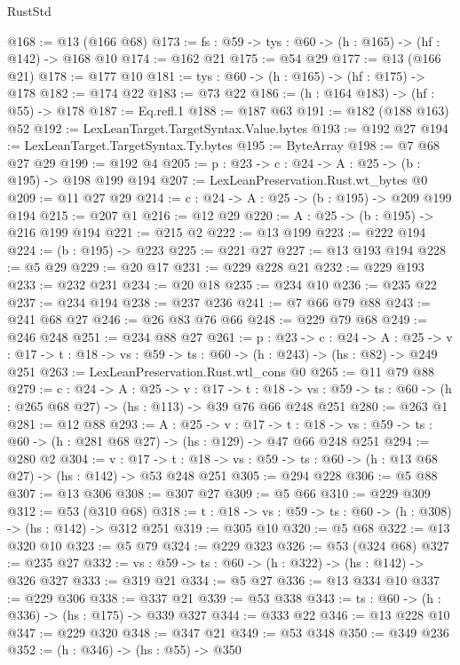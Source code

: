 \begin{lexlean}{RustStd}
\begin{coremodule}
@168 := @13 (@166 @68)
@173 := {fs : @59} -> {tys : @60} -> (h : @165) -> (hf : @142) -> @168 @10
@174 := @162 @21
@175 := @54 @29
@177 := @13 (@166 @21)
@178 := @177 @10
@181 := {tys : @60} -> (h : @165) -> (hf : @175) -> @178
@182 := @174 @22
@183 := @73 @22
@186 := (h : @164 @183) -> (hf : @55) -> @178
@187 := Eq.refl.{1}
@188 := @187 @63
@191 := @182 (@188 @163) @52
@192 := LexLeanTarget.TargetSyntax.Value.bytes
@193 := @192 @27
@194 := LexLeanTarget.TargetSyntax.Ty.bytes
@195 := ByteArray
@198 := @7 @68 @27 @29
@199 := @192 @4
@205 := {p : @23} -> {c : @24} -> {A : @25} -> (b : @195) -> @198 @199 @194
@207 := LexLeanPreservation.Rust.wt_bytes @0
@209 := @11 @27 @29
@214 := {c : @24} -> {A : @25} -> (b : @195) -> @209 @199 @194
@215 := @207 @1
@216 := @12 @29
@220 := {A : @25} -> (b : @195) -> @216 @199 @194
@221 := @215 @2
@222 := @13 @199
@223 := @222 @194
@224 := (b : @195) -> @223
@225 := @221 @27
@227 := @13 @193 @194
@228 := @5 @29
@229 := @20 @17
@231 := @229 @228 @21
@232 := @229 @193
@233 := @232 @231
@234 := @20 @18
@235 := @234 @10
@236 := @235 @22
@237 := @234 @194
@238 := @237 @236
@241 := @7 @66 @79 @88
@243 := @241 @68 @27
@246 := @26 @83 @76 @66
@248 := @229 @79 @68
@249 := @246 @248
@251 := @234 @88 @27
@261 := {p : @23} ->
  {c : @24} ->
  {A : @25} ->
  {v : @17} -> {t : @18} -> {vs : @59} -> {ts : @60} -> (h : @243) -> (hs : @82) -> @249 @251
@263 := LexLeanPreservation.Rust.wtl_cons @0
@265 := @11 @79 @88
@279 := {c : @24} ->
  {A : @25} ->
  {v : @17} ->
  {t : @18} ->
  {vs : @59} -> {ts : @60} -> (h : @265 @68 @27) -> (hs : @113) -> @39 @76 @66 @248 @251
@280 := @263 @1
@281 := @12 @88
@293 := {A : @25} ->
  {v : @17} ->
  {t : @18} -> {vs : @59} -> {ts : @60} -> (h : @281 @68 @27) -> (hs : @129) -> @47 @66 @248 @251
@294 := @280 @2
@304 := {v : @17} ->
  {t : @18} -> {vs : @59} -> {ts : @60} -> (h : @13 @68 @27) -> (hs : @142) -> @53 @248 @251
@305 := @294 @228
@306 := @5 @88
@307 := @13 @306
@308 := @307 @27
@309 := @5 @66
@310 := @229 @309
@312 := @53 (@310 @68)
@318 := {t : @18} -> {vs : @59} -> {ts : @60} -> (h : @308) -> (hs : @142) -> @312 @251
@319 := @305 @10
@320 := @5 @68
@322 := @13 @320 @10
@323 := @5 @79
@324 := @229 @323
@326 := @53 (@324 @68)
@327 := @235 @27
@332 := {vs : @59} -> {ts : @60} -> (h : @322) -> (hs : @142) -> @326 @327
@333 := @319 @21
@334 := @5 @27
@336 := @13 @334 @10
@337 := @229 @306
@338 := @337 @21
@339 := @53 @338
@343 := {ts : @60} -> (h : @336) -> (hs : @175) -> @339 @327
@344 := @333 @22
@346 := @13 @228 @10
@347 := @229 @320
@348 := @347 @21
@349 := @53 @348
@350 := @349 @236
@352 := (h : @346) -> (hs : @55) -> @350

\end{coremodule}
\end{lexlean}
